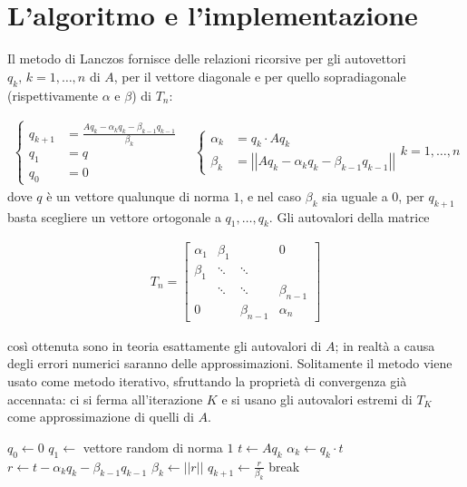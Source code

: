 \documentclass[11pt]{article}
\numberwithin{equation}{subsection}
\newcommand{\norm}[1]{\ensuremath{\left|\left|#1\right|\right|}}
\begin{document}
\section{L'algoritmo e l'implementazione}
\label{sec-2}
Il metodo di Lanczos fornisce delle relazioni ricorsive per gli autovettori $q_k, \, k=1, \ldots, n$ di $A$, per il vettore diagonale e per quello sopradiagonale (rispettivamente $\alpha$ e $\beta$) di $T_n$:

\begin{align}
\label{relaz}
\left\{
\begin{array}{ll}
q_{k+1} &= \frac{Aq_k -\alpha_k q_k - \beta_{k-1}q_{k-1}}{\beta_k} \\
q_1 &= q \\
q_0 &= 0
\end{array}
\right.
\quad \left\{
\begin{array}{ll}
\alpha_k &= q_k \cdot A q_k \\
\beta_k &= \norm{Aq_k -\alpha_k q_k - \beta_{k-1}q_{k-1}}
\end{array}
\right.
k=1, \ldots, n
\end{align}
dove $q$ è un vettore qualunque di norma $1$, e nel caso $\beta_k$ sia uguale a $0$, per $q_{k+1}$ basta scegliere un vettore ortogonale a $q_1,\ldots, q_k$.
Gli autovalori della matrice 

\begin{align*}
T_n = \begin{bmatrix}
\alpha_1 & \beta_1 & & 0\\
\beta_1 & \ddots & \ddots & \\
& \ddots & \ddots & \beta_{n-1} \\
0 & & \beta_{n-1} & \alpha_n
\end{bmatrix}
\end{align*}

così ottenuta sono in teoria esattamente gli autovalori di $A$; in realtà a causa degli errori numerici saranno delle approssimazioni. Solitamente il metodo viene usato come metodo iterativo, sfruttando la proprietà di convergenza già accennata: ci si ferma all'iterazione $K$ e si usano gli autovalori estremi di $T_K$ come approssimazione di quelli di $A$.

\begin{algorithm} 
\caption{}
\label{algo}
\begin{algorithmic}
\State $q_0 \gets 0$
\State $q_1 \gets$ vettore random di norma $1$
\State $t \gets A q_k$
\State $\alpha_k \gets q_k \cdot t$
\State $r \gets t - \alpha_k q_k - \beta_{k-1}q_{k-1}$
\State $\beta_{k} \gets \norm{r}$
\State $q_{k+1} \gets \frac{r}{\beta_k}$
\Else 
\State break
\EndIf
\EndIf
\EndFor
\end{algorithmic}
\end{algorithm}
\end{document}
